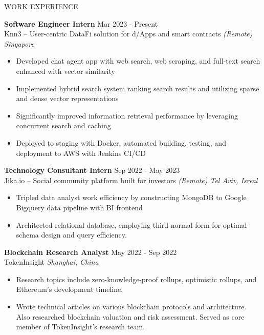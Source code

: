 \documentclass{cv} %
\begin{document}
\begin{rSection}{WORK EXPERIENCE}

	\textbf{Software Engineer Intern} \hfill Mar 2023 - Present\\
	Knn3 – User-centric DataFi solution for d/Apps and smart contracts  \hfill \textit{(Remote) Singapore}
	\begin{itemize}
		\item Developed chat agent app with web search, web scraping, and full-text search enhanced with vector similarity
		\item Implemented hybrid search system ranking search results and utilizing sparse and dense vector representations
		\item Significantly improved information retrieval performance by leveraging concurrent search and caching
		\item Deployed to staging with Docker, automated building, testing, and deployment to AWS with Jenkins CI/CD
	\end{itemize}

	\textbf{Technology Consultant Intern} \hfill Sep 2022 - May 2023\\
	Jika.io – Social community platform built for investors \hfill \textit{(Remote) Tel Aviv, Isreal}
	\begin{itemize}
		\item Tripled data analyst work efficiency by constructing MongoDB to Google Bigquery data pipeline with BI frontend
		\item Architected relational database, employing third normal form for optimal schema design and query efficiency.
	\end{itemize}

	\textbf{Blockchain Research Analyst} \hfill May 2022 - Sep 2022 \\
	TokenInsight \hfill \textit{Shanghai, China}
	\begin{itemize}
		\item Research topics include zero-knowledge-proof rollups, optimistic rollups, and Ethereum’s development timeline.
		\item Wrote technical articles on various blockchain protocols and architecture. Also researched blockchain valuation and risk assessment. Served as core member of TokenInsight’s research team.
	\end{itemize}

\end{rSection}


\end{document}
